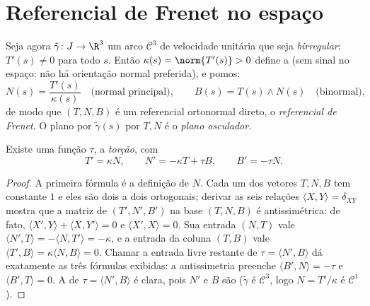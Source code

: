 \section{Referencial de Frenet no espaço}

Seja agora $\tilde\gamma \colon J \to \R^3$ um arco $\mathcal{C}^3$ de velocidade
unitária que seja \emph{birregular}: $T'(s) \neq 0$ para
todo $s$. Então $\kappa(s) = \norm{T'(s)} > 0$ define a
\emph{} (sem sinal no espaço: não há orientação normal
preferida), e pomos:
\[
N(s) = \frac{T'(s)}{\kappa(s)}
\quad\text{(normal principal)},
\qquad
B(s) = T(s) \wedge N(s)
\quad\text{(binormal)} ,
\]
de modo que $(T, N, B)$ é um referencial ortonormal direto, o
\emph{referencial de Frenet}. O plano por $\tilde\gamma(s)$  por
$T, N$ é o \emph{plano osculador}.

\begin{theorem}\label{thm:b2:curves:frenet3d}
Existe uma função  $\tau$, a \emph{torção}, com
\[
T' = \kappa N, \qquad
N' = -\kappa T + \tau B, \qquad
B' = -\tau N .
\]
\end{theorem}

\begin{proof}
A primeira fórmula é a definição de $N$. Cada um dos vetores
$T, N, B$ tem  constante $1$ e eles são dois a dois ortogonais;
derivar as seis relações $\langle X, Y\rangle = \delta_{XY}$
mostra que a matriz de $(T', N', B')$ na base $(T, N, B)$ é
antissimétrica: de fato, $\langle X', Y\rangle + \langle X, Y'\rangle = 0$ e
$\langle X', X\rangle = 0$. Sua entrada $(N, T)$ vale $\langle N', T\rangle =
-\langle N, T'\rangle = -\kappa$, e a entrada da coluna $(T, B)$
vale $\langle T', B\rangle = \kappa\langle N, B\rangle = 0$. Chamar a entrada
livre restante de $\tau = \langle N', B\rangle$ dá exatamente as três fórmulas
exibidas: a antissimetria preenche $\langle B', N\rangle = -\tau$ e
$\langle B', T\rangle = 0$. A  de $\tau = \langle N', B\rangle$ é clara,
pois $N'$ e $B$ são  ($\tilde\gamma$ é
$\mathcal{C}^3$, logo $N = T'/\kappa$ é $\mathcal{C}^1$).
\end{proof}

